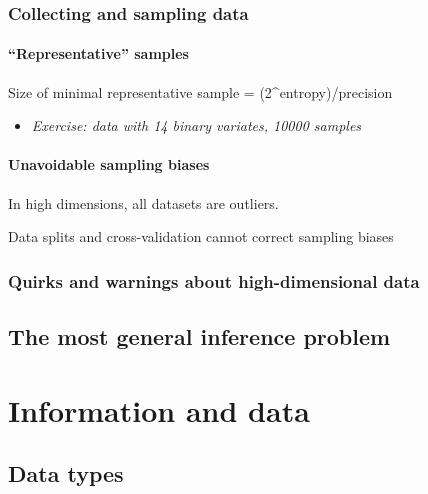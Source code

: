 \documentclass[
  a4paper,
  DIV=11,
  numbers=noendperiod,
  oneside]{scrreprt}
\providecommand{\tightlist}{%
  \setlength{\itemsep}{0pt}\setlength{\parskip}{0pt}}\usepackage{longtable,booktabs,array}
\begin{document}
\hypertarget{collecting-and-sampling-data}{%
\section{Collecting and sampling
data}\label{collecting-and-sampling-data}}

\hypertarget{representative-samples}{%
\subsection{``Representative'' samples}\label{representative-samples}}

Size of minimal representative sample = (2\^{}entropy)/precision

\begin{itemize}
\tightlist
\item
  \emph{Exercise: data with 14 binary variates, 10000 samples}
\end{itemize}

\hypertarget{unavoidable-sampling-biases}{%
\subsection{Unavoidable sampling
biases}\label{unavoidable-sampling-biases}}

In high dimensions, all datasets are outliers.

Data splits and cross-validation cannot correct sampling biases

\hypertarget{quirks-and-warnings-about-high-dimensional-data}{%
\section{Quirks and warnings about high-dimensional
data}\label{quirks-and-warnings-about-high-dimensional-data}}

\hypertarget{the-most-general-inference-problem}{%
\chapter{The most general inference
problem}\label{the-most-general-inference-problem}}

\part{Information and data}

\hypertarget{sec-data-types}{%
\chapter{Data types}\label{sec-data-types}}
\end{document}
